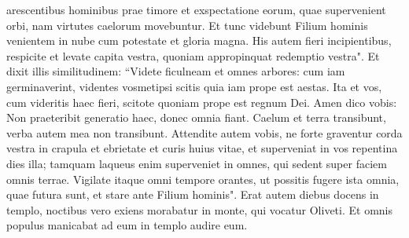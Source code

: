 \begin{biblechapter}
\verse arescentibus hominibus prae timore et exspectatione eorum, quae supervenient orbi, nam virtutes caelorum movebuntur. 
\verse Et tunc videbunt Filium hominis venientem in nube cum potestate et gloria magna. 
\verse His autem fieri incipientibus, respicite et levate capita vestra, quoniam appropinquat redemptio vestra". 
\verse Et dixit illis similitudinem: “Videte ficulneam et omnes arbores: 
\verse cum iam germinaverint, videntes vosmetipsi scitis quia iam prope est aestas. 
\verse Ita et vos, cum videritis haec fieri, scitote quoniam prope est regnum Dei.  
\verse Amen dico vobis: Non praeteribit generatio haec, donec omnia fiant. 
\verse Caelum et terra transibunt, verba autem mea non transibunt. 
\verse Attendite autem vobis, ne forte graventur corda vestra in crapula et ebrietate et curis huius vitae, et superveniat in vos repentina dies illa;  
\verse tamquam laqueus enim superveniet in omnes, qui sedent super faciem omnis terrae. 
\verse Vigilate itaque omni tempore orantes, ut possitis fugere ista omnia, quae futura sunt, et stare ante Filium hominis". 
\verse Erat autem diebus docens in templo, noctibus vero exiens morabatur in monte, qui vocatur Oliveti. 
\verse Et omnis populus manicabat ad eum in templo audire eum. 
\end{biblechapter}

